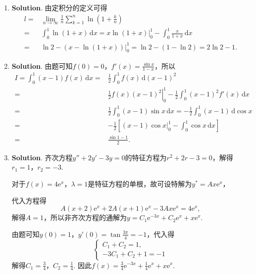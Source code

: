 \documentclass[../main.tex]{subfiles}
\begin{document}
\begin{enumerate}
    \item \textbf{Solution}. 由定积分的定义可得
          \[
              \begin{aligned}
                  l= {} & \lim_{n\to\infty}\frac{1}{n}\sum_{k=1}^{n}\ln\left(1+\frac{k}{n}\right)                            \\
                  = {}  & \int_{0}^{1}\ln(1+x)\,\mathrm{d}x = x\ln(1+x)\bigg|_{0}^{1}-\int_{0}^{1}\frac{x}{1+x}\,\mathrm{d}x \\
                  = {}  & \ln 2 -\left(x-\ln(1+x)\right)\bigg|_{0}^{1}= \ln 2 - (1-\ln 2) = 2\ln 2 -1.
              \end{aligned}
          \]

    \item \textbf{Solution}. 由题可知$f(0)=0$，$f'(x)=\frac{\sin x}{1-x}$，所以
          \[
              \begin{aligned}
                  I = \int_{0}^{1}(x-1) f(x)\,\mathrm{d}x = {} & \frac{1}{2}\int_{0}^{1}f(x)\,\mathrm{d}(x-1)^{2}                                                  \\
                  = {}                                         & \left.\frac{1}{2}f(x)(x-1)^{2}\right|_{0}^{1}-\frac{1}{2}\int_{0}^{1}(x-1)^{2}f'(x)\,\mathrm{d}x  \\
                  = {}                                         & \frac{1}{2}\int_{0}^{1}(x-1)\sin x\,\mathrm{d}x = -\frac{1}{2}\int_{0}^{1}(x-1)\,\mathrm{d}\cos x \\
                  = {}                                         & -\frac{1}{2}\left[(x-1)\cos x\bigg|_{0}^{1}-\int_{0}^{1}\cos x\,\mathrm{d}x\right]                \\
                  = {}                                         & \frac{\sin 1-1}{2}.
              \end{aligned}
          \]

    \item \textbf{Solution}. 齐次方程$y''+2y'-3y=0$的特征方程为$r^{2}+2r-3=0$，解得$r
                  _{1}=1$，$r_{2}=-3$.

          对于$f(x)=4\mathrm{e}^{x}$，$\lambda = 1$是特征方程的单根，故可设特解为$y^{*}
              =Ax\mathrm{e}^{x}$，

          代入方程得
          \[
              A(x+2)\mathrm{e}^{x}+2A(x+1)\mathrm{e}^{x}-3Ax\mathrm{e}^{x}=4\mathrm{e}^{x},
          \]
          解得$A=1$，所以非齐次方程的通解为$y=C_{1}\mathrm{e}^{-3x}+C_{2}\mathrm{e}^{x}+x\mathrm{e}^{x}$.

          由题可知$y(0)=1$，$y'(0)=\tan\frac{3\pi}{4}=-1$，代入得
          \[
              \begin{cases}
                  C_{1}+C_{2}=1, \\
                  -3C_{1}+C_{2}+1=-1
              \end{cases}
          \]
          解得$C_{1}=\frac{3}{4}$，$C_{2}=\frac{1}{4}$. 因此$f(x)=\frac{3}{4}\mathrm{e}^{-3x}+\frac{1}{4}\mathrm{e}^{x}+x\mathrm{e}^{x}$.
\end{enumerate}
\end{document}
